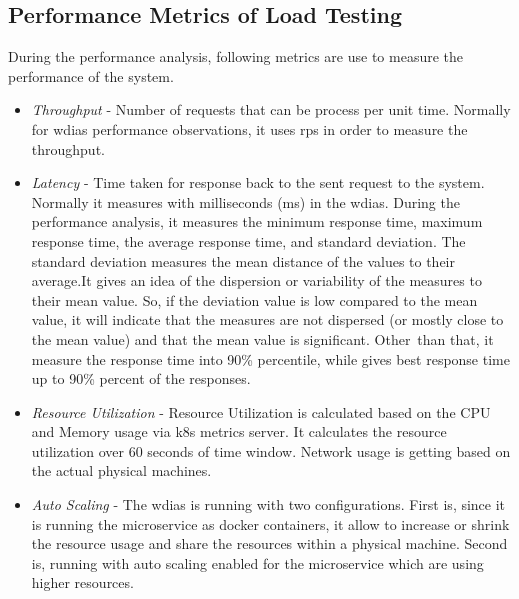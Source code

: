 \subsection{Performance Metrics of Load Testing}
\label{subse:test_plan_metrics}
During the performance analysis, following metrics are use to measure the performance of the system.
\begin{itemize}
    \item \emph{Throughput} - Number of requests that can be process per unit time. Normally for \acrshort{wdias} performance observations, it uses \acrfull{rps} in order to measure the throughput.
    \item \emph{Latency} - Time taken for response back to the sent request to the system. Normally it measures with milliseconds (ms) in the \acrshort{wdias}. During the performance analysis, it measures the minimum response time, maximum response time, the average response time, and standard deviation. The standard deviation measures the mean distance of the values to their average.It gives an idea of the dispersion or variability of the measures to their mean value. So, if the deviation value is low compared to the mean value, it will indicate that the measures are not dispersed (or mostly close to the mean value) and that the mean value is significant. Other than that, it measure the response time into 90\% percentile, while gives best response time up to 90\% percent of the responses.
    \item \emph{Resource Utilization} - Resource Utilization is calculated based on the CPU and Memory usage via \acrshort{k8s} metrics server. It calculates the resource utilization over 60 seconds of time window. Network usage is getting based on the actual physical machines.
    \item \emph{Auto Scaling} - The \acrshort{wdias} is running with two configurations. First is, since it is running the microservice as docker containers, it allow to increase or shrink the resource usage and share the resources within a physical machine. Second is, running with auto scaling enabled for the microservice which are using higher resources.
\end{itemize}
